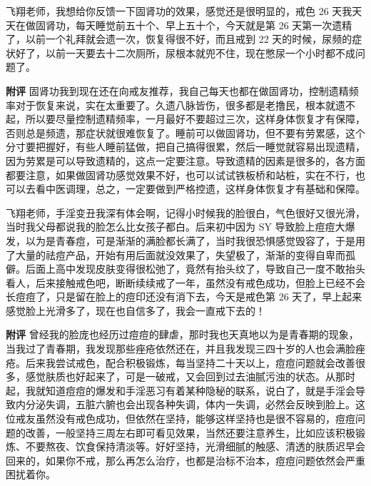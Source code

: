 \begin{case}
    飞翔老师，我想给你反馈一下固肾功的效果，感觉还是很明显的，戒色 26 天我天天在做固肾功，每天睡觉前五十个、早上五十个，今天就是第 26 天第一次遗精了，以前一个礼拜就会遗一次，恢复得很不好，而且戒到 22 天的时候，尿频的症状好了，以前一天要去十二次厕所，尿根本就兜不住，现在憋尿一个小时都不成问题了。

    \textbf{附评} 固肾功我到现在还在向戒友推荐，我自己每天也都在做固肾功，控制遗精频率对于恢复来说，实在太重要了。久遗八脉皆伤，很多都是老撸民，根本就遗不起，所以要尽量控制遗精频率，一月最好不要超过三次，这样身体恢复才有保障，否则总是频遗，那症状就很难恢复了。睡前可以做固肾功，但不要有劳累感，这个分寸要把握好，有些人睡前猛做，把自己搞得很累，然后一睡觉就容易出现遗精，因为劳累是可以导致遗精的，这点一定要注意。导致遗精的因素是很多的，各方面都要注意，如果做固肾功感觉效果不好，也可以试试铁板桥和站桩，实在不行，也可以去看中医调理，总之，一定要做到严格控遗，这样身体恢复才有基础和保障。
\end{case}

\begin{case}
    飞翔老师，手淫变丑我深有体会啊，记得小时候我的脸很白，气色很好又很光滑，当时我父母都说我的脸怎么比女孩子都白。后来初中因为 SY 导致脸上痘痘大爆发，以为是青春痘，可是渐渐的满脸都长满了，当时我很恐惧感觉毁容了，于是用了大量的祛痘产品，开始有用后面就没效果了，失望极了，渐渐的变得自卑而孤僻。后面上高中发现皮肤变得很松弛了，竟然有抬头纹了，导致自己一度不敢抬头看人，后来接触戒色吧，断断续续戒了一年，虽然没有戒色成功，但脸上已经不会长痘痘了，只是留在脸上的痘印还没有消下去，今天是戒色第 26 天了，早上起来感觉脸上光滑多了，现在也自信多了，我会一直戒下去的！

    \textbf{附评} 曾经我的脸庞也经历过痘痘的肆虐，那时我也天真地以为是青春期的现象，当我过了青春期，我发现那些痤疮依然还在，并且我发现三四十岁的人也会满脸痤疮。后来我尝试戒色，配合积极锻炼，每当坚持二十天以上，痘痘问题就会改善很多，感觉肤质也好起来了，可是一破戒，又会回到过去油腻污浊的状态。从那时起，我就知道痘痘的爆发和手淫恶习有着某种隐秘的联系，说白了，就是手淫会导致内分泌失调，五脏六腑也会出现各种失调，体内一失调，必然会反映到脸上。这位戒友虽然没有戒色成功，但依然在坚持，能够这样坚持也是很不容易的，痘痘问题的改善，一般坚持三周左右即可看见效果，当然还要注意养生，比如应该积极锻炼、不要熬夜、饮食保持清淡等。好好坚持，光滑细腻的触感、清透的肤质迟早会回来的，如果你不戒，那么再怎么治疗，也都是治标不治本，痘痘问题依然会严重困扰着你。
\end{case}

